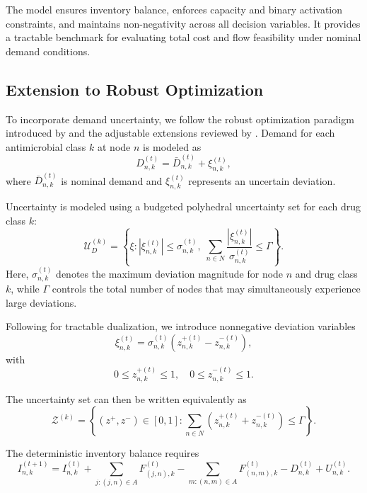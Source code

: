 \documentclass{article}
\begin{document}
The model ensures inventory balance, enforces capacity and binary activation constraints, and maintains non-negativity across all decision variables. It provides a tractable benchmark for evaluating total cost and flow feasibility under nominal demand conditions.

\subsection{Extension to Robust Optimization}
\label{4.4}

To incorporate demand uncertainty, we follow the robust optimization paradigm introduced by \cite{bental} and the adjustable extensions reviewed by \cite{yanikoglu2018aro}. Demand for each antimicrobial class \(k\) at node \(n\) is modeled as
\begin{equation}
D_{n,k}^{(t)} = \bar{D}_{n,k}^{(t)} + \xi_{n,k}^{(t)},
\end{equation}
where \(\bar{D}_{n,k}^{(t)}\) is nominal demand and \(\xi_{n,k}^{(t)}\) represents an uncertain deviation.

Uncertainty is modeled using a budgeted polyhedral uncertainty set for each drug class \(k\):
\begin{equation}
\mathcal{U}_D^{(k)} =
\left\{
\xi :
|\xi_{n,k}^{(t)}| \le \sigma_{n,k}^{(t)}, \;
\sum_{n \in N} \frac{|\xi_{n,k}^{(t)}|}{\sigma_{n,k}^{(t)}} \le \Gamma
\right\}.
\end{equation}
Here, \(\sigma_{n,k}^{(t)}\) denotes the maximum deviation magnitude for node \(n\) and drug class \(k\), while \(\Gamma\) controls the total number of nodes that may simultaneously experience large deviations.

Following \cite{bertsim04} for tractable dualization, we introduce nonnegative deviation variables
\begin{equation}
\xi_{n,k}^{(t)} = \sigma_{n,k}^{(t)}\left(z_{n,k}^{+(t)} - z_{n,k}^{-(t)}\right),
\end{equation}
with
\begin{equation}
0 \le z_{n,k}^{+(t)} \le 1, \quad 0 \le z_{n,k}^{-(t)} \le 1.
\end{equation}

The uncertainty set can then be written equivalently as
\begin{equation}
\mathcal{Z}^{(k)} =
\left\{
(z^+,z^-)\in[0,1] :
\sum_{n \in N} \left(z_{n,k}^{+(t)} + z_{n,k}^{-(t)}\right) \le \Gamma
\right\}.
\end{equation}

The deterministic inventory balance requires
\begin{equation}
I^{(t+1)}_{n,k} =
I^{(t)}_{n,k}
+ \sum_{j:(j,n)\in A} F^{(t)}_{(j,n),k}
- \sum_{m:(n,m)\in A} F^{(t)}_{(n,m),k}
- D^{(t)}_{n,k}
+ U^{(t)}_{n,k}.
\end{equation}
\end{document}

